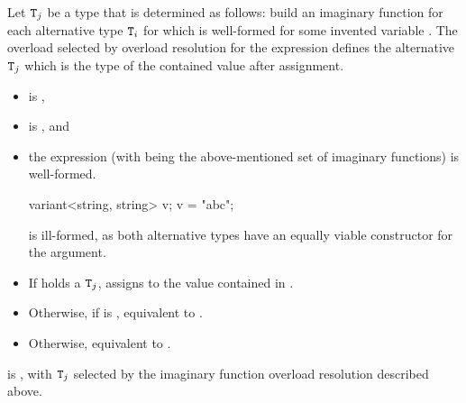 \begin{itemdescr}
\pnum
Let $\texttt{\protect T}_j$ be a type that is determined as follows:
build an imaginary function 
for each alternative type $\texttt{\protect T}_i$
for which  
is well-formed for some invented variable .
The overload  selected by overload
resolution for the expression  defines
the alternative $\texttt{\protect T}_j$ which is the type of the contained value after
assignment.

\pnum
\constraints
\begin{itemize}
\item
{} is ,

\item
{}
is , and

\item
the expression 
(with  being the above-mentioned set
of imaginary functions) is well-formed.
\begin{note}
\begin{codeblock}
variant<string, string> v;
v = "abc";
\end{codeblock}
is ill-formed, as both alternative types have an equally viable constructor
for the argument.
\end{note}
\end{itemize}

\pnum
\effects
\begin{itemize}
\item
If  holds a $\texttt{\protect T}_j$, assigns  to
the value contained in .
\item
Otherwise, if 
 is ,
equivalent to .
\item
Otherwise, equivalent to .
\end{itemize}

\pnum
\ensures
{} is , with $\texttt{\protect T}_j$
selected by the imaginary function overload resolution described above.


\end{itemdescr}
